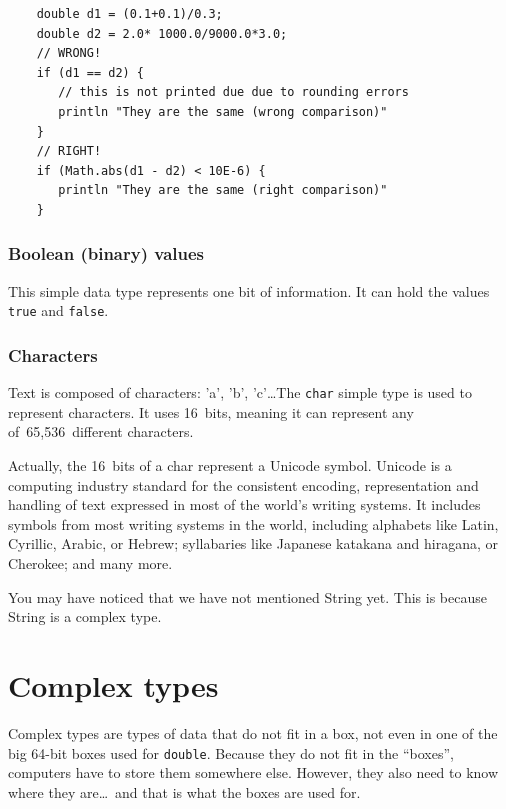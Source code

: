 
\begin{verbatim}
    double d1 = (0.1+0.1)/0.3;
    double d2 = 2.0* 1000.0/9000.0*3.0;
    // WRONG!
    if (d1 == d2) {
       // this is not printed due due to rounding errors
       println "They are the same (wrong comparison)" 
    } 
    // RIGHT!
    if (Math.abs(d1 - d2) < 10E-6) {
       println "They are the same (right comparison)"
    } 
\end{verbatim}



\subsubsection{Boolean (binary) values}
\label{sec:bool-binary-valu}

This simple data type represents one bit of information. It can hold
the values \verb+true+ and \verb+false+. 

\subsubsection{Characters}
\label{sec:characters}

Text is composed of characters: 'a', 'b', 'c'\ldots The \verb+char+
simple type is
used to represent characters. It uses 16~bits, meaning it can
represent any of~65,536~different characters. 

Actually, the 16~bits of a char represent a Unicode symbol. Unicode is
a computing industry standard for the consistent encoding,
representation and handling of text expressed in most of the world's
writing systems. It includes symbols from most writing systems in
the world, including alphabets like Latin, Cyrillic, Arabic, or
Hebrew; syllabaries like Japanese katakana and hiragana, or
Cherokee; and many more. 

You may have noticed that we have not mentioned String yet. This is
because String is a complex type. 

\section{Complex types}
\label{sec:complex-types}

Complex types are types of data that do not fit in a box, not even in
one of the big 64-bit boxes used for \verb+double+. Because they do
not fit in the ``boxes'', computers have to store them somewhere
else. However, they also need to know where they are\ldots~and that is
what the boxes are used for. 

